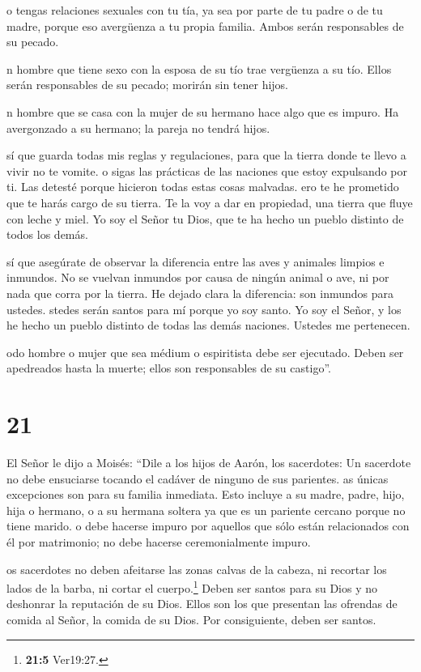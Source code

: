  o tengas relaciones sexuales con tu tía, ya sea por parte
de tu padre o de tu madre, porque eso avergüenza a tu propia familia.
Ambos serán responsables de su pecado.

 n hombre que tiene sexo con la esposa de su tío trae
vergüenza a su tío. Ellos serán responsables de su pecado; morirán sin
tener hijos.

 n hombre que se casa con la mujer de su hermano hace algo
que es impuro. Ha avergonzado a su hermano; la pareja no tendrá hijos.

 sí que guarda todas mis reglas y regulaciones, para que la
tierra donde te llevo a vivir no te vomite.  o sigas las
prácticas de las naciones que estoy expulsando por ti. Las detesté
porque hicieron todas estas cosas malvadas.  ero te he
prometido que te harás cargo de su tierra. Te la voy a dar en propiedad,
una tierra que fluye con leche y miel. Yo soy el Señor tu Dios, que te
ha hecho un pueblo distinto de todos los demás.

 sí que asegúrate de observar la diferencia entre las aves
y animales limpios e inmundos. No se vuelvan inmundos por causa de
ningún animal o ave, ni por nada que corra por la tierra. He dejado
clara la diferencia: son inmundos para ustedes.  stedes
serán santos para mí porque yo soy santo. Yo soy el Señor, y los he
hecho un pueblo distinto de todas las demás naciones. Ustedes me
pertenecen.

 odo hombre o mujer que sea médium o espiritista debe ser
ejecutado. Deben ser apedreados hasta la muerte; ellos son responsables
de su castigo''.

\hypertarget{section-20}{%
\section{21}\label{section-20}}

 El Señor le dijo a Moisés: ``Dile a los hijos de Aarón, los
sacerdotes: Un sacerdote no debe ensuciarse tocando el cadáver de
ninguno de sus parientes.  as únicas excepciones son para su
familia inmediata. Esto incluye a su madre, padre, hijo, hija o hermano,
 o a su hermana soltera ya que es un pariente cercano porque
no tiene marido.  o debe hacerse impuro por aquellos que
sólo están relacionados con él por matrimonio; no debe hacerse
ceremonialmente impuro.

 os sacerdotes no deben afeitarse las zonas calvas de la
cabeza, ni recortar los lados de la barba, ni cortar el
cuerpo.\footnote{\textbf{21:5} Ver19:27.}  Deben ser santos
para su Dios y no deshonrar la reputación de su Dios. Ellos son los que
presentan las ofrendas de comida al Señor, la comida de su Dios. Por
consiguiente, deben ser santos.

